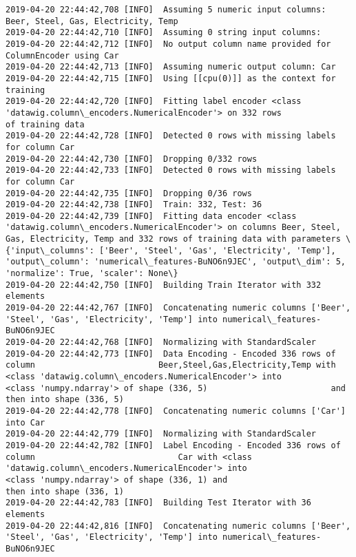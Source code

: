 \documentclass[11pt]{article}
\begin{document}
    \begin{Verbatim}[commandchars=\\\{\}]
2019-04-20 22:44:42,708 [INFO]  Assuming 5 numeric input columns: Beer, Steel, Gas, Electricity, Temp
2019-04-20 22:44:42,710 [INFO]  Assuming 0 string input columns: 
2019-04-20 22:44:42,712 [INFO]  No output column name provided for ColumnEncoder using Car
2019-04-20 22:44:42,713 [INFO]  Assuming numeric output column: Car
2019-04-20 22:44:42,715 [INFO]  Using [[cpu(0)]] as the context for training
2019-04-20 22:44:42,720 [INFO]  Fitting label encoder <class 'datawig.column\_encoders.NumericalEncoder'> on 332 rows                             of training data
2019-04-20 22:44:42,728 [INFO]  Detected 0 rows with missing labels                         for column Car
2019-04-20 22:44:42,730 [INFO]  Dropping 0/332 rows
2019-04-20 22:44:42,733 [INFO]  Detected 0 rows with missing labels                         for column Car
2019-04-20 22:44:42,735 [INFO]  Dropping 0/36 rows
2019-04-20 22:44:42,738 [INFO]  Train: 332, Test: 36
2019-04-20 22:44:42,739 [INFO]  Fitting data encoder <class 'datawig.column\_encoders.NumericalEncoder'> on columns Beer, Steel, Gas, Electricity, Temp and 332 rows of training data with parameters \{'input\_columns': ['Beer', 'Steel', 'Gas', 'Electricity', 'Temp'], 'output\_column': 'numerical\_features-BuNO6n9JEC', 'output\_dim': 5, 'normalize': True, 'scaler': None\}
2019-04-20 22:44:42,750 [INFO]  Building Train Iterator with 332 elements
2019-04-20 22:44:42,767 [INFO]  Concatenating numeric columns ['Beer', 'Steel', 'Gas', 'Electricity', 'Temp'] into numerical\_features-BuNO6n9JEC
2019-04-20 22:44:42,768 [INFO]  Normalizing with StandardScaler
2019-04-20 22:44:42,773 [INFO]  Data Encoding - Encoded 336 rows of column                         Beer,Steel,Gas,Electricity,Temp with <class 'datawig.column\_encoders.NumericalEncoder'> into                         <class 'numpy.ndarray'> of shape (336, 5)                         and then into shape (336, 5)
2019-04-20 22:44:42,778 [INFO]  Concatenating numeric columns ['Car'] into Car
2019-04-20 22:44:42,779 [INFO]  Normalizing with StandardScaler
2019-04-20 22:44:42,782 [INFO]  Label Encoding - Encoded 336 rows of column                             Car with <class 'datawig.column\_encoders.NumericalEncoder'> into                             <class 'numpy.ndarray'> of shape (336, 1) and                             then into shape (336, 1)
2019-04-20 22:44:42,783 [INFO]  Building Test Iterator with 36 elements
2019-04-20 22:44:42,816 [INFO]  Concatenating numeric columns ['Beer', 'Steel', 'Gas', 'Electricity', 'Temp'] into numerical\_features-BuNO6n9JEC

\end{Verbatim}
\end{document}
